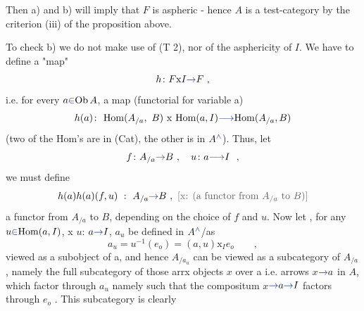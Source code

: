 \documentclass[10pt,oneside]{book}
\newcommand{\hand}[1]{{\ifnum\EditionMode=2\color{black}\else\color{PSHand}\fi #1}}
\let\over\relax
\newcommand{\xout}[1]{{\color{PSTypedOld}\ifmmode\text{[x: }#1\text{]}\else[\textsf{x:} #1]\fi}}
\begin{document}
Then  a) and b) will imply that $F$ is aspheric - hence $A$ is a test-category
by the criterion (iii) of the proposition above.

To check b) we do not make use of  (T 2),  nor of the asphericity of
$I$.  We have to define a "map"
\[ h\colon F\mathrm{x}I\hand{\to} F\ , \]
i.e. for every $a\hand{\in}\mathrm{Ob}\,A$,  a map (functorial for variable a)
\[ h(a)\colon\ \mathrm{Hom}(A_{/a},\ B)\ \mathrm{x}\ \mathrm{Hom}(a,I)\hand{\longrightarrow} \mathrm{Hom}(A_{/a},B) \]
(two of the Hom's are in (Cat), the other is in $A^{\hand{\wedge}}$).  Thus,  let
\[ f\colon A_{/a}\hand{\to} B\ ,\quad u\colon a\hand{\longrightarrow} I\ \ , \]
we must define
\[ \over{h(a)}{h(a)}(f,u)\ :\ A_{/a}\hand{\to} B\ ,\ \xout{\text{(a functor from }A_{/a}\text{ to }B)} \]
a functor from $A_{/a}$ to $B$,  depending on the choice of $f$ and $u$.  Now let ,
for any  $u\hand{\in}\mathrm{Hom}(a,I)$, \xout{x} $u$: $a\hand{\to} I$,  $a_u$ be defined in $A^{\hand{\wedge}}$\hand{/}as
\[ a_u = u^{-1}(e_o) = (a,u)\mathrm{x}_I e_o\qquad , \]
viewed as a subobject of a,  and hence $A_{/a_u}$  can be viewed as a subcategory
of $A_{/a}$ ,  namely the  full subcategory of those \xout{arrx} objects \hand{$x$} over a
i.e. arrows \hand{$x$}$\hand{\to} a$ in $A$,  which factor through $a_u$ namely such that the
compositum  \hand{$x$}$\hand{\to} a\hand{\to} I$  factors through $e_o$ .  This subcategory is clearly
\end{document}
